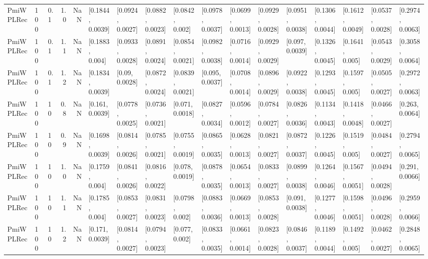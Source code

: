 \begin{tabular}{lllrrllllllllllll}
 PmiWPLRec &  100 &   0.1 &   1.0 &   NaN &  [0.1844, 0.0039] &  [0.0924, 0.0027] &  [0.0882, 0.0023] &   [0.0842, 0.002] &  [0.0978, 0.0037] &  [0.0699, 0.0013] &  [0.0929, 0.0028] &  [0.0951, 0.0038] &  [0.1306, 0.0044] &  [0.1612, 0.0049] &  [0.0537, 0.0028] &  [0.2974, 0.0063] \\
 PmiWPLRec &  100 &   0.1 &   1.1 &   NaN &   [0.1883, 0.004] &  [0.0933, 0.0028] &  [0.0891, 0.0024] &  [0.0854, 0.0021] &  [0.0982, 0.0038] &  [0.0716, 0.0014] &  [0.0929, 0.0029] &   [0.097, 0.0039] &  [0.1326, 0.0045] &   [0.1641, 0.005] &  [0.0543, 0.0029] &  [0.3058, 0.0064] \\
 PmiWPLRec &  100 &   0.1 &   1.2 &   NaN &  [0.1834, 0.0039] &    [0.09, 0.0028] &  [0.0872, 0.0024] &  [0.0839, 0.0021] &   [0.095, 0.0037] &  [0.0708, 0.0014] &  [0.0896, 0.0029] &  [0.0922, 0.0038] &  [0.1293, 0.0045] &   [0.1597, 0.005] &  [0.0505, 0.0027] &  [0.2972, 0.0063] \\
 PmiWPLRec &  100 &    10 &   0.8 &   NaN &   [0.161, 0.0039] &  [0.0778, 0.0025] &  [0.0736, 0.0021] &   [0.071, 0.0018] &  [0.0827, 0.0034] &  [0.0596, 0.0012] &  [0.0784, 0.0027] &  [0.0826, 0.0036] &  [0.1134, 0.0043] &  [0.1418, 0.0048] &  [0.0466, 0.0027] &   [0.263, 0.0064] \\
 PmiWPLRec &  100 &    10 &   0.9 &   NaN &  [0.1698, 0.0039] &  [0.0814, 0.0026] &  [0.0785, 0.0021] &  [0.0755, 0.0019] &  [0.0865, 0.0035] &  [0.0628, 0.0013] &  [0.0821, 0.0027] &  [0.0872, 0.0037] &  [0.1226, 0.0045] &   [0.1519, 0.005] &  [0.0484, 0.0027] &  [0.2794, 0.0065] \\
 PmiWPLRec &  100 &    10 &   1.0 &   NaN &   [0.1759, 0.004] &  [0.0841, 0.0026] &  [0.0816, 0.0022] &   [0.078, 0.0019] &  [0.0878, 0.0035] &  [0.0654, 0.0013] &  [0.0833, 0.0027] &  [0.0899, 0.0038] &  [0.1264, 0.0046] &  [0.1567, 0.0051] &  [0.0494, 0.0028] &   [0.291, 0.0066] \\
 PmiWPLRec &  100 &    10 &   1.1 &   NaN &   [0.1785, 0.004] &  [0.0853, 0.0027] &  [0.0831, 0.0023] &   [0.0798, 0.002] &  [0.0883, 0.0036] &  [0.0669, 0.0013] &  [0.0853, 0.0028] &   [0.091, 0.0038] &  [0.1277, 0.0046] &  [0.1598, 0.0051] &  [0.0496, 0.0028] &  [0.2959, 0.0066] \\
 PmiWPLRec &  100 &    10 &   1.2 &   NaN &   [0.171, 0.0039] &  [0.0814, 0.0027] &  [0.0794, 0.0023] &    [0.077, 0.002] &  [0.0833, 0.0035] &  [0.0661, 0.0014] &  [0.0823, 0.0028] &  [0.0846, 0.0037] &  [0.1189, 0.0044] &   [0.1492, 0.005] &  [0.0462, 0.0027] &  [0.2848, 0.0065] \\

\end{tabular}
